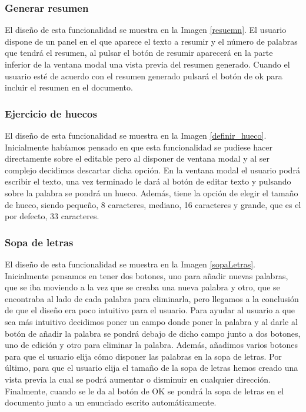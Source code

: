 \subsubsection{Generar resumen}
El diseño de esta funcionalidad se muestra en la Imagen \ref{resuemn}. El usuario dispone de un panel en el que aparece el texto a resumir y el número de palabras que tendrá el resumen, al pulsar el botón de resumir aparecerá en la parte inferior de la ventana modal una vista previa del resumen generado. Cuando el usuario esté de acuerdo con el resumen generado pulsará el botón de ok para incluir el resumen en el documento.

\subsubsection{Ejercicio de huecos}
El diseño de esta funcionalidad se muestra en la Imagen \ref{definir_hueco}. Inicialmente habíamos pensado en que esta funcionalidad se pudiese hacer directamente sobre el editable pero al disponer de ventana modal y al ser complejo decidimos descartar dicha opción. En la ventana modal el usuario podrá escribir el texto, una vez terminado le dará al botón de editar texto y pulsando sobre la palabra se pondrá un hueco. Además, tiene la opción de elegir el tamaño de hueco, siendo pequeño, 8 caracteres, mediano, 16 caracteres y grande, que es el por defecto, 33 caracteres.  

\subsubsection{Sopa de letras}
El diseño de esta funcionalidad se muestra en la Imagen \ref{sopaLetras}. Inicialmente pensamos en tener dos botones, uno para añadir nuevas palabras, que se iba moviendo a la vez que se creaba una nueva palabra y otro, que se encontraba al lado de cada palabra para eliminarla, pero llegamos a la conclusión de que el diseño era poco intuitivo para el usuario. Para ayudar al usuario a que sea más intuitivo decidimos poner un campo donde poner la palabra y al darle al botón de añadir la palabra se pondrá debajo de dicho campo junto a dos botones, uno de edición y otro para eliminar la palabra. Además, añadimos varios botones para que el usuario elija cómo disponer las palabras en la sopa de letras. Por último, para que el usuario elija el tamaño de la sopa de letras hemos creado una vista previa la cual se podrá aumentar o disminuir en cualquier dirección. Finalmente, cuando se le da al botón de OK se pondrá la sopa de letras en el documento junto a un enunciado escrito automáticamente. 

